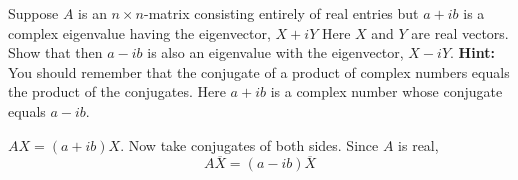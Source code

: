 \begin{ex} Suppose $A$ is an $n\times n$-matrix consisting entirely of real
entries but $a+ib$ is a complex eigenvalue having the eigenvector, $X+iY$ Here $X$ and $Y$ are real vectors. Show
that then $a-ib$ is also an eigenvalue with the eigenvector, $X-iY$. \textbf{Hint: }You should remember that the conjugate of a
product of complex numbers equals the product of the conjugates. Here $a+ib$
is a complex number whose conjugate equals $a-ib$.
\begin{sol}
 $AX=(
a+ib)X$. Now take conjugates of both sides. Since $A$ is
real,
\[
A\overline{X}=(a-ib) \overline{X}
\]
\end{sol}
\end{ex}

